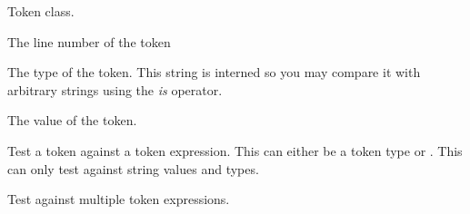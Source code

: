 \documentclass[a4paper,10pt,english]{sphinxmanual}
\begin{document}
\begin{fulllineitems}
\label{extensions:jinja2.lexer.Token}
Token class.

\begin{fulllineitems}
\label{extensions:jinja2.ext.Token.lineno}
The line number of the token

\end{fulllineitems}


\begin{fulllineitems}
\label{extensions:jinja2.ext.Token.type}
The type of the token.  This string is interned so you may compare
it with arbitrary strings using the \emph{is} operator.

\end{fulllineitems}


\begin{fulllineitems}
\label{extensions:jinja2.ext.Token.value}
The value of the token.

\end{fulllineitems}


\begin{fulllineitems}
\label{extensions:jinja2.lexer.Token.test}
Test a token against a token expression.  This can either be a
token type or .  This can only test
against string values and types.

\end{fulllineitems}


\begin{fulllineitems}
\label{extensions:jinja2.lexer.Token.test_any}
Test against multiple token expressions.

\end{fulllineitems}


\end{fulllineitems}
\end{document}
